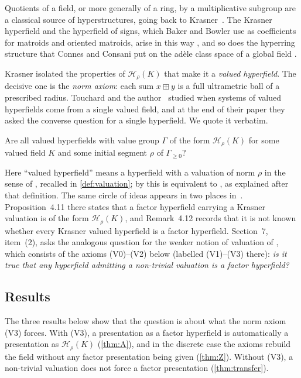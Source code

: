 \documentclass[11pt]{amsart}
\numberwithin{equation}{section}
\newcommand{\hplus}{\boxplus}
\newcommand{\Hr}{\mathcal H_\rho}
\begin{document}
Quotients of a field, or more generally of a ring, by a multiplicative subgroup are a classical source of hyperstructures, going back to Krasner~\cite{Krasner83}. The Krasner hyperfield and the hyperfield of signs, which Baker and Bowler use as coefficients for matroids and oriented matroids, arise in this way \cite[Remark~2.7 and Examples~2.10, 2.13]{BakerBowler19}, and so does the hyperring structure that Connes and Consani put on the ad\`ele class space of a global field \cite{ConnesConsani11}.

Krasner isolated the properties of $\Hr(K)$ that make it a \emph{valued hyperfield}. The decisive one is the \emph{norm axiom}: each sum $x\hplus y$ is a full ultrametric ball of a prescribed radius. Touchard and the author~\cite{LT25} studied when systems of valued hyperfields come from a single valued field, and at the end of their paper they asked the converse question for a single hyperfield. We quote it verbatim.

\begin{question*}[{\cite[Question~1, p.~23]{LT25}}]
Are all valued hyperfields with value group $\Gamma$ of the form $\mathcal H_\rho(K)$ for some valued field $K$ and some initial segment $\rho$ of $\Gamma_{\ge 0}$?
\end{question*}

Here ``valued hyperfield'' means a hyperfield with a valuation of norm $\rho$ in the sense of \cite[Definition~4.6]{Linzi25}, recalled in \cref{def:valuation}; by \cite[Proposition~4.8(i)]{Linzi25} this is equivalent to \cite[Definition~1.8]{LT25}, as explained after that definition. The same circle of ideas appears in two places in~\cite{Linzi25}. Proposition~4.11 there states that a factor hyperfield carrying a Krasner valuation is of the form $\Hr(K)$, and Remark~4.12 records that it is not known whether every Krasner valued hyperfield is a factor hyperfield. Section~7, item~(2), asks the analogous question for the weaker notion of valuation of \cite[Definition~3.1]{Linzi25}, which consists of the axioms (V0)--(V2) below (labelled (V1)--(V3) there): \emph{is it true that any hyperfield admitting a non-trivial valuation is a factor hyperfield?}

\subsection{Results}
The three results below show that the question is about what the norm axiom (V3) forces. With (V3), a presentation as a factor hyperfield is automatically a presentation as $\Hr(K)$ (\cref{thm:A}), and in the discrete case the axioms rebuild the field without any factor presentation being given (\cref{thm:Z}). Without (V3), a non-trivial valuation does not force a factor presentation (\cref{thm:transfer}).
\end{document}

